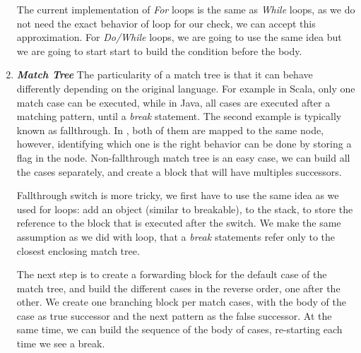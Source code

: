 \begin{enumerate}
	The current implementation of \emph{For} loops is the same as \emph{While} loops, as we do not need the exact behavior of loop for our check, we can accept this approximation.
	For \emph{Do/While} loops, we are going to use the same idea but we are going to start start to build the condition before the body.
	
	\item \textbf{\textit{Match Tree}} \newline 
	\label{subsubsec:match_tree_cfg}
	The particularity of a match tree is that it can behave differently depending on the original language.
	For example in Scala, only one match case can be executed, while in Java, all cases are executed after a matching pattern, until a \emph{break} statement.
	The second example is typically known as fallthrough. 
	In \slang{}, both of them are mapped to the same node, however, identifying which one is the right behavior can be done by storing a flag in the node.
	Non-fallthrough match tree is an easy case, we can build all the cases separately, and create a block that will have multiples successors.
	
	Fallthrough switch is more tricky, we first have to use the same idea as we used for loops: add an object (similar to breakable), to the stack, to store the reference to the block that is executed after the switch. 
	We make the same assumption as we did with loop, that a \emph{break} statements refer only to the closest enclosing match tree. 
	
	The next step is to create a forwarding block for the default case of the match tree, and build the different cases in the reverse order, one after the other. 
	We create one branching block per match cases, with the body of the case as true successor and the next pattern as the false successor. 
	At the same time, we can build the sequence of the body of cases, re-starting each time we see a break.
	
	
	

\end{enumerate}
